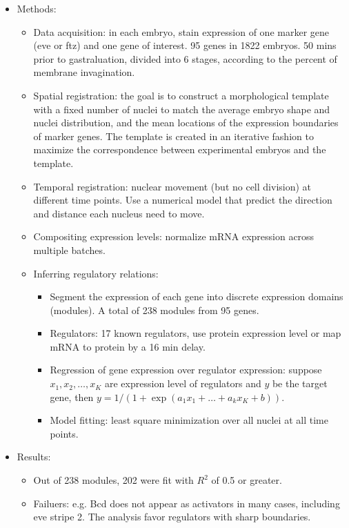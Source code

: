 \documentclass{report}
\begin{document}
\begin{enumerate}
\begin{itemize}
		\item Methods: 
		\begin{itemize}
			\item Data acquisition: in each embryo, stain expression of one marker gene (eve or ftz) and one gene of interest. 95 genes in 1822 embryos. 50 mins prior to gastraluation, divided into 6 stages, according to the percent of membrane invagination. 
			\item Spatial registration: the goal is to construct a morphological template with a fixed number of nuclei to match the average embryo shape and nuclei distribution, and the mean locations of the expression boundaries of marker genes. The template is created in an iterative fashion to maximize the correspondence between experimental embryos and the template.
			\item Temporal registration: nuclear movement (but no cell division) at different time points. Use a numerical model that predict the direction and distance each nucleus need to move. 
			\item Compositing expression levels: normalize mRNA expression across multiple batches. 
			\item Inferring regulatory relations: 
			\begin{itemize}
				\item Segment the expression of each gene into discrete expression domains (modules). A total of 238 modules from 95 genes.
				\item Regulators: 17 known regulators, use protein expression level or map mRNA to protein by a 16 min delay. 
				\item Regression of gene expression over regulator expression: suppose $x_1, x_2, \ldots, x_K$ are expression level of regulators and $y$ be the target gene, then $y = 1 / (1 + \exp(a_1 x_1 + \ldots + a_k x_K + b))$. 
				\item Model fitting: least square minimization over all nuclei at all time points. 
			\end{itemize}
		\end{itemize}
		
		\item Results: 
		\begin{itemize}
			\item Out of 238 modules, 202 were fit with $R^2$ of 0.5 or greater. 
			\item Failuers: e.g. Bcd does not appear as activators in many cases, including eve stripe 2. The analysis favor regulators with sharp boundaries. 
		\end{itemize}
	\end{itemize}
	

\end{enumerate}
\end{document}
